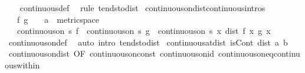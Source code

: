 \begin{isabellebody}
%
\isadelimproof
\ \ %
\endisadelimproof
%
\isatagproof
{}\isamarkupfalse%
\ continuous{\isacharunderscore}{\kern0pt}def\ \isamarkupfalse%
\ {\isacharparenleft}{\kern0pt}rule\ tendsto{\isacharunderscore}{\kern0pt}dist{\isacharparenright}{\kern0pt}%
\endisatagproof
{\isafoldproof}%
%
\isadelimproof
\isanewline
%
\endisadelimproof
\isanewline
{}\isamarkupfalse%
\ continuous{\isacharunderscore}{\kern0pt}on{\isacharunderscore}{\kern0pt}dist{\isacharbrackleft}{\kern0pt}continuous{\isacharunderscore}{\kern0pt}intros{\isacharbrackright}{\kern0pt}{\isacharcolon}{\kern0pt}\isanewline
\ \ \ f\ g\ {\isacharcolon}{\kern0pt}{\isacharcolon}{\kern0pt}\ {\isachardoublequoteopen}{\isacharunderscore}{\kern0pt}\ {\isasymRightarrow}\ {\isacharprime}{\kern0pt}a\ {\isacharcolon}{\kern0pt}{\isacharcolon}{\kern0pt}\ metric{\isacharunderscore}{\kern0pt}space{\isachardoublequoteclose}\isanewline
\ \ \ {\isachardoublequoteopen}continuous{\isacharunderscore}{\kern0pt}on\ s\ f\ {\isasymLongrightarrow}\ continuous{\isacharunderscore}{\kern0pt}on\ s\ g\ {\isasymLongrightarrow}\ continuous{\isacharunderscore}{\kern0pt}on\ s\ {\isacharparenleft}{\kern0pt}{\isasymlambda}x{\isachardot}{\kern0pt}\ dist\ {\isacharparenleft}{\kern0pt}f\ x{\isacharparenright}{\kern0pt}\ {\isacharparenleft}{\kern0pt}g\ x{\isacharparenright}{\kern0pt}{\isacharparenright}{\kern0pt}{\isachardoublequoteclose}\isanewline
%
\isadelimproof
\ \ %
\endisadelimproof
%
\isatagproof
{}\isamarkupfalse%
\ continuous{\isacharunderscore}{\kern0pt}on{\isacharunderscore}{\kern0pt}def\ \isamarkupfalse%
\ {\isacharparenleft}{\kern0pt}auto\ intro{\isacharcolon}{\kern0pt}\ tendsto{\isacharunderscore}{\kern0pt}dist{\isacharparenright}{\kern0pt}%
\endisatagproof
{\isafoldproof}%
%
\isadelimproof
\isanewline
%
\endisadelimproof
\isanewline
{}\isamarkupfalse%
\ continuous{\isacharunderscore}{\kern0pt}at{\isacharunderscore}{\kern0pt}dist{\isacharcolon}{\kern0pt}\ {\isachardoublequoteopen}isCont\ {\isacharparenleft}{\kern0pt}dist\ a{\isacharparenright}{\kern0pt}\ b{\isachardoublequoteclose}\isanewline
%
\isadelimproof
\ \ %
\endisadelimproof
%
\isatagproof
{}\isamarkupfalse%
\ continuous{\isacharunderscore}{\kern0pt}on{\isacharunderscore}{\kern0pt}dist\ {\isacharbrackleft}{\kern0pt}OF\ continuous{\isacharunderscore}{\kern0pt}on{\isacharunderscore}{\kern0pt}const\ continuous{\isacharunderscore}{\kern0pt}on{\isacharunderscore}{\kern0pt}id{\isacharbrackright}{\kern0pt}\ continuous{\isacharunderscore}{\kern0pt}on{\isacharunderscore}{\kern0pt}eq{\isacharunderscore}{\kern0pt}continuous{\isacharunderscore}{\kern0pt}within\ \isamarkupfalse%

\end{isabellebody}
